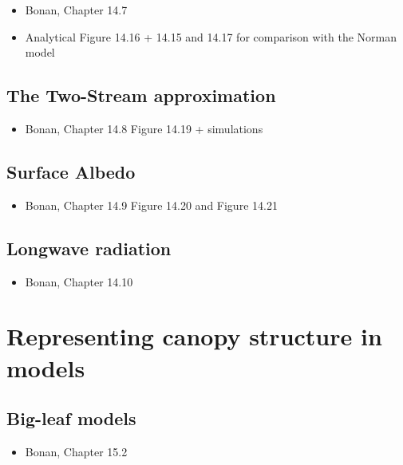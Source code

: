 \documentclass[oneside]{book}
\providecommand{\tightlist}{%
  \setlength{\itemsep}{0pt}\setlength{\parskip}{0pt}}
\begin{document}
\begin{itemize}
\tightlist
\item
  Bonan, Chapter 14.7
\item
  Analytical Figure 14.16 + 14.15 and 14.17 for comparison with the
  Norman model
\end{itemize}

\subsection{The Two-Stream
approximation}\label{the-two-stream-approximation}

\begin{itemize}
\tightlist
\item
  Bonan, Chapter 14.8 Figure 14.19 + simulations
\end{itemize}

\subsection{Surface Albedo}\label{surface-albedo}

\begin{itemize}
\tightlist
\item
  Bonan, Chapter 14.9 Figure 14.20 and Figure 14.21
\end{itemize}

\subsection{Longwave radiation}\label{longwave-radiation}

\begin{itemize}
\tightlist
\item
  Bonan, Chapter 14.10
\end{itemize}

\section{Representing canopy structure in
models}\label{representing-canopy-structure-in-models}

\subsection{Big-leaf models}\label{big-leaf-models}

\begin{itemize}
\tightlist
\item
  Bonan, Chapter 15.2
\end{itemize}
\end{document}
